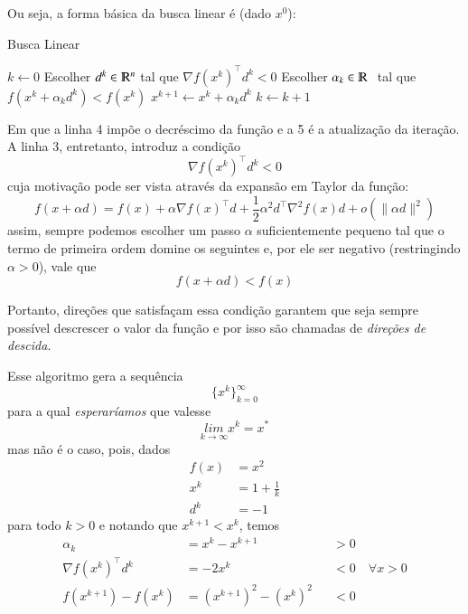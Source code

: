 \documentclass[a4paper,11pt]{article}
\begin{document}
        Ou seja, a forma básica da busca linear é (dado $x^0$):
        \begin{algorithm}[h]
            \caption{Busca Linear}
            \label{alg:ls}
            \begin{algorithmic}[1]
                \State $k \gets 0$
                    \State Escolher $d^k \in \varmathbb{R}^n$ tal que $\nabla f(x^k)^\top d^k < 0$
                    \State Escolher $\alpha_k \in \varmathbb{R}$\,\, tal que $f(x^k + \alpha_k d^k) < f(x^k)$
                    \State $x^{k+1} \gets x^k + \alpha_k d^k$
                    \State $k \gets k + 1$
                \EndWhile
            \end{algorithmic}
        \end{algorithm}

        Em que a linha 4 impõe o decréscimo da função e a 5 é a atualização da iteração.
        A linha 3, entretanto, introduz a condição
        \begin{equation}
            \label{eq:desc}
            \nabla f(x^k)^\top d^k < 0
        \end{equation}
        cuja motivação pode ser vista através da expansão em Taylor da função:
            $$ f(x + \alpha d) = f(x) + \alpha\nabla f(x)^\top d + \frac{1}{2}\alpha^2d^\top\nabla^2 f(x)d + o(\|\alpha d\|^2)  $$
        assim, sempre podemos escolher um passo $\alpha$ suficientemente pequeno tal que o termo de primeira ordem domine os seguintes
        e, por ele ser negativo (restringindo $\alpha > 0$), vale que
            $$ f(x + \alpha d) < f(x) $$

        Portanto, direções que satisfaçam essa condição garantem que seja sempre possível descrescer o valor da função e por isso
        são chamadas de \emph{direções de descida}.

        Esse algoritmo gera a sequência
            $$ \{x^k\}_{k = 0}^\infty $$
        para a qual \emph{esperaríamos} que valesse
            $$ \underset{k \rightarrow \infty}{lim} x^k = x^*$$
        mas não é o caso, pois, dados
            \begin{align*}
                f(x) &= {x}^2 \\
                x^k  &= 1 + \frac{1}{k} \\
                d^k  &= -1
            \end{align*}
        para todo $k > 0$ e notando que $x^{k+1} < x^{k}$, temos
        \begin{align*}
            \alpha_k &= x^k - x^{k+1}  & &> 0 \\
            \nabla f(x^k)^\top d^k &= -2x^k & &< 0 \quad \forall x > 0 \\
            f(x^{k+1}) - f(x^k) &= (x^{k+1})^2 - (x^{k})^2 & &< 0
        \end{align*}
\end{document}
